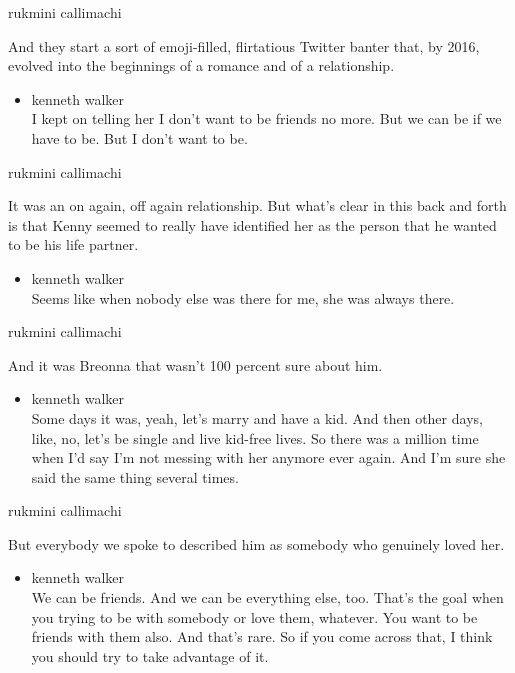 rukmini callimachi

And they start a sort of emoji-filled, flirtatious Twitter banter that,
by 2016, evolved into the beginnings of a romance and of a relationship.

\begin{itemize}
\tightlist
\item
  kenneth walker\\
  I kept on telling her I don't want to be friends no more. But we can
  be if we have to be. But I don't want to be.
\end{itemize}

rukmini callimachi

It was an on again, off again relationship. But what's clear in this
back and forth is that Kenny seemed to really have identified her as the
person that he wanted to be his life partner.

\begin{itemize}
\tightlist
\item
  kenneth walker\\
  Seems like when nobody else was there for me, she was always there.
\end{itemize}

rukmini callimachi

And it was Breonna that wasn't 100 percent sure about him.

\begin{itemize}
\tightlist
\item
  kenneth walker\\
  Some days it was, yeah, let's marry and have a kid. And then other
  days, like, no, let's be single and live kid-free lives. So there was
  a million time when I'd say I'm not messing with her anymore ever
  again. And I'm sure she said the same thing several times.
\end{itemize}

rukmini callimachi

But everybody we spoke to described him as somebody who genuinely loved
her.

\begin{itemize}
\tightlist
\item
  kenneth walker\\
  We can be friends. And we can be everything else, too. That's the goal
  when you trying to be with somebody or love them, whatever. You want
  to be friends with them also. And that's rare. So if you come across
  that, I think you should try to take advantage of it.
\end{itemize}

